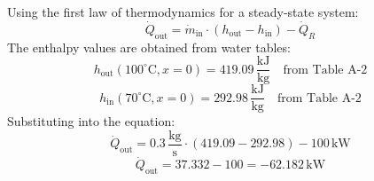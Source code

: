 Using the first law of thermodynamics for a steady-state system:  
\[
\dot{Q}_{\text{out}} = \dot{m}_{\text{in}} \cdot (h_{\text{out}} - h_{\text{in}}) - \dot{Q}_R
\]  
The enthalpy values are obtained from water tables:  
\[
h_{\text{out}}(100^\circ\text{C}, x=0) = 419.09 \, \frac{\text{kJ}}{\text{kg}} \quad \text{from Table A-2}
\]  
\[
h_{\text{in}}(70^\circ\text{C}, x=0) = 292.98 \, \frac{\text{kJ}}{\text{kg}} \quad \text{from Table A-2}
\]  
Substituting into the equation:  
\[
\dot{Q}_{\text{out}} = 0.3 \, \frac{\text{kg}}{\text{s}} \cdot (419.09 - 292.98) - 100 \, \text{kW}
\]  
\[
\dot{Q}_{\text{out}} = 37.332 - 100 = -62.182 \, \text{kW}
\]